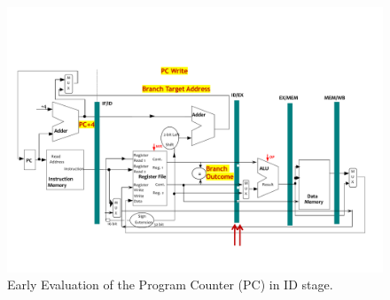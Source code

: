 \begin{figure}[!htp]
    \centering
    \includegraphics[width=\textwidth]{img/optimization-solution-control-hazard.pdf}
    \caption{Early Evaluation of the Program Counter (PC) in ID stage.}
\end{figure}

